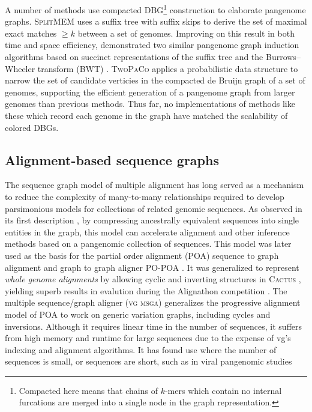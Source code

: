 A number of methods use compacted DBG\footnote{Compacted here means that chains of $k$-mers which contain no internal furcations are merged into a single node in the graph representation.} construction to elaborate pangenome graphs.
\textsc{SplitMEM} \cite{Marcus_2014} uses a suffix tree with suffix skips to derive the set of maximal exact matches $\geq k$ between a set of genomes.
Improving on this result in both time and space efficiency, \cite{Baier_2015} demonstrated two similar pangenome graph induction algorithms based on succinct representations of the suffix tree and the Burrows--Wheeler transform (BWT) \cite{Burrows_1994}.
\textsc{TwoPaCo} \cite{Minkin_2016} applies a probabilistic data structure to narrow the set of candidate verticies in the compacted de Bruijn graph of a set of genomes, supporting the efficient generation of a pangenome graph from larger genomes than previous methods.
Thus far, no implementations of methods like these which record each genome in the graph have matched the scalability of colored DBGs.

\subsection{Alignment-based sequence graphs}

The sequence graph model of multiple alignment has long served as a mechanism to reduce the complexity of many-to-many relationships required to develop parsimonious models for collections of related genomic sequences.
As observed in its first description \cite{hein1989new}, by compressing ancestrally equivalent sequences into single entities in the graph, this model can accelerate alignment and other inference methods based on a pangenomic collection of sequences.
This model was later used as the basis for the partial order alignment (POA) sequence to graph alignment and graph to graph aligner PO-POA \cite{Lee_2002,Grasso_2004}.
It was generalized to represent \emph{whole genome alignments} by allowing cyclic and inverting structures in \textsc{Cactus} \cite{Paten_2011}, yielding superb results in evalution during the Alignathon competition \cite{earl2014alignathon}.
The multiple sequence/graph aligner (\textsc{vg msga}) \cite{Novak_2017a,Garrison_2018,Garrison_2019} generalizes the progressive alignment model of POA to work on generic variation graphs, including cycles and inversions.
Although it requires linear time in the number of sequences, it suffers from high memory and runtime for large sequences due to the expense of vg's indexing and alignment algorithms.
It has found use where the number of sequences is small, or sequences are short, such as in viral pangenomic studies \cite{Baaijens2019-ng}

